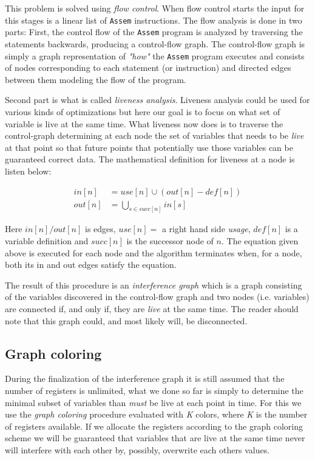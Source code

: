 \documentclass[11pt]{amsart}
\begin{document}
This problem is solved using \textit{flow control}. When flow control starts the input for this stages is a linear list of \texttt{Assem} instructions. The flow analysis is done in two parts: First, the control flow of the \texttt{Assem} program is analyzed by traversing the statements backwards, producing a control-flow graph. The control-flow graph is simply a graph representation of \textit{"how"} the \texttt{Assem} program executes and consists of nodes corresponding to each statement (or instruction) and directed edges between them modeling the flow of the program.

Second part is what is called \textit{liveness analysis}. Liveness analysis could be used for various kinds of optimizations but here our goal is to focus on what set of variable is live at the same time. What liveness now does is to traverse the control-graph determining at each node the set of variables that needs to be \textit{live} at that point so that future points that potentially use those variables can be guaranteed correct data. The mathematical definition for liveness at a node is listen below:

\begin{align*}
in[n] &= use[n] \cup (out[n] - def[n]) \\
out[n] &= \bigcup_{s \in succ[n]} in[s]
\end{align*}

Here $in[n]/out[n]$ is edges, $use[n] =$ a right hand side \textit{usage}, $def[n]$ is a variable definition and $succ[n]$ is the successor node of $n$. The equation given above is executed for each node and the algorithm terminates when, for a node, both its in and out edges satisfy the equation. 

The result of this procedure is an \textit{interference graph} which is a graph consisting of the variables discovered in the control-flow graph and two nodes (i.e. variables) are connected if, and only if, they are \textit{live} at the same time. The reader should note that this graph could, and most likely will, be disconnected.

\subsection{Graph coloring}
During the finalization of the interference graph it is still assumed that the number of registers is unlimited, what we done so far is simply to determine the minimal subset of variables than \textit{must} be live at each point in time. For this we use the \textit{graph coloring} procedure evaluated with \textit{K} colors, where \textit{K} is the number of registers available. If we allocate the registers according to the graph coloring scheme we will be guaranteed that variables that are live at the same time never will interfere with each other by, possibly, overwrite each others values.
\end{document}
